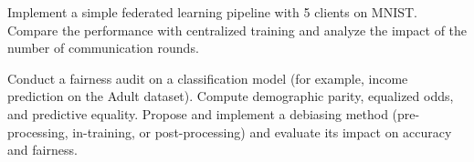 \begin{exercise}
Implement a simple federated learning pipeline with 5 clients on MNIST. Compare the performance with centralized training and analyze the impact of the number of communication rounds.
\end{exercise}

\begin{exercise}
Conduct a fairness audit on a classification model (for example, income prediction on the Adult dataset). Compute demographic parity, equalized odds, and predictive equality. Propose and implement a debiasing method (pre-processing, in-training, or post-processing) and evaluate its impact on accuracy and fairness.
\end{exercise}
